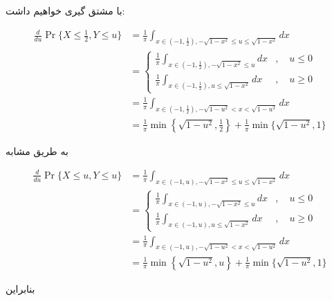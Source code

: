 \documentclass{article}
\newcommand{\eqn}[1]{
\begin{equation}\begin{split}
#1
\end{split}\end{equation}
}
\begin{document}
با مشتق گیری خواهیم داشت:
\eqn{
\frac{d}{du}
\Pr\{X\le \frac{1}{2},Y\le u\}
&=
\frac{1}{\pi}\int_{x\in(-1,\frac{1}{2}),-\sqrt{1-x^2}\le u\le \sqrt{1-x^2}}dx
\\&=
\begin{cases}
\frac{1}{\pi}\int_{x\in(-1,\frac{1}{2}),-\sqrt{1-x^2}\le u}dx&,\quad u\le 0\\
\frac{1}{\pi}\int_{x\in(-1,\frac{1}{2}),u\le \sqrt{1-x^2}}dx&,\quad u\ge 0
\end{cases}
\\&=
\frac{1}{\pi}\int_{x\in(-1,\frac{1}{2}),-\sqrt{1-u^2}<x<\sqrt{1-u^2}}dx
\\&=
\frac{1}{\pi}\min\left\{\sqrt{1-u^2},\frac{1}{2}\right\}+\frac{1}{\pi}\min\{\sqrt{1-u^2},1\}
}

به طریق مشابه

\eqn{
\frac{d}{du}
\Pr\{X\le u,Y\le u\}
&=
\frac{1}{\pi}\int_{x\in(-1,u),-\sqrt{1-x^2}\le u\le \sqrt{1-x^2}}dx
\\&=
\begin{cases}
\frac{1}{\pi}\int_{x\in(-1,u),-\sqrt{1-x^2}\le u}dx&,\quad u\le 0\\
\frac{1}{\pi}\int_{x\in(-1,u),u\le \sqrt{1-x^2}}dx&,\quad u\ge 0
\end{cases}
\\&=
\frac{1}{\pi}\int_{x\in(-1,u),-\sqrt{1-u^2}<x<\sqrt{1-u^2}}dx
\\&=
\frac{1}{\pi}\min\left\{\sqrt{1-u^2},u\right\}+\frac{1}{\pi}\min\{\sqrt{1-u^2},1\}
}
بنابراین

\end{document}
